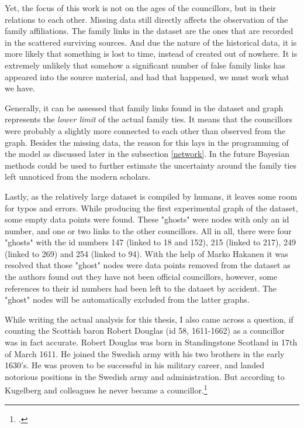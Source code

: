 Yet, the focus of this work is not on the ages of the councillors, but in their relations to each other. Missing data still directly affects the observation of the family affiliations. The family links in the dataset are the ones that are recorded in the scattered surviving sources. And due the nature of the historical data, it is more likely that something is lost to time, instead of created out of nowhere. It is extremely unlikely that somehow a significant number of false family links has appeared into the source material, and had that happened, we must work what we have.

Generally, it can be assessed that family links found in the dataset and graph represents the \textit{lower limit} of the actual family ties. It means that the councillors were probably a slightly more connected to each other than observed from the graph. Besides the missing data, the reason for this lays in the programming of the model as discussed later in the subsection \ref{network}. In the future Bayesian methods could be used to further estimate the uncertainty around the family ties left unnoticed from the modern scholars.

Lastly, as the relatively large dataset is compiled by humans, it leaves some room for typos and errors. While producing the first experimental graph of the dataset, some empty data points were found. These "ghosts" were nodes with only an id number, and one or two links to the other councillors. All in all, there were four "ghosts" with the id numbers 147 (linked to 18 and 152), 215 (linked to 217), 249 (linked to 269) and 254 (linked to 94). With the help of Marko Hakanen it was resolved that those "ghost" nodes were data points removed from the dataset as the authors found out they have not been official councillors, however, some references to their id numbers had been left to the dataset by accident. The "ghost" nodes will be automatically excluded from the latter graphs.

While writing the actual analysis for this thesis, I also came across a question, if counting the Scottish baron Robert Douglas (id 58, 1611-1662) as a councillor was in fact accurate. Robert Douglas was born in Standingstone Scotland in 17th of March 1611. He joined the Swedish army with his two brothers in the early 1630's. He was proven to be successful in his military career, and landed notorious positions in the Swedish army and administration. But according to Kugelberg and colleagues he never became a councillor.\footcite{sbl_robert_douglas}

